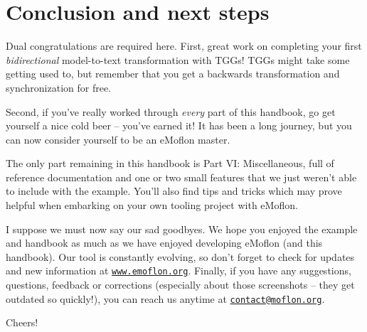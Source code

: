 \section{Conclusion and next steps}
\genHeader

Dual congratulations are required here. First, great work on completing your first \emph{bidirectional} model-to-text transformation with TGGs! TGGs
might take some getting used to, but remember that you get a backwards transformation and synchronization for free.

Second, if you've really worked through \emph{every} part of this handbook, go get yourself a nice cold beer -- you've earned it! It
has been a long journey, but you can now consider yourself to be an eMoflon master.

The only part remaining in this handbook is Part VI: Miscellaneous, full of reference documentation and one or two small features that we just weren't able to
include with the example. You'll also find tips and tricks which may prove helpful when embarking on your own tooling project with eMoflon.

I suppose we must now say our sad goodbyes. We hope you enjoyed the example and handbook as much as we have enjoyed developing eMoflon (and this handbook). Our
tool is constantly evolving, so don't forget to check for updates and new information at \texttt{\url{www.emoflon.org}}. Finally, if you have any suggestions,
questions, feedback or corrections (especially about those screenshots -- they get outdated so quickly!), you can reach us anytime at
\texttt{\href{mailto:contact@moflon.org}{contact@moflon.org}}.

Cheers!
